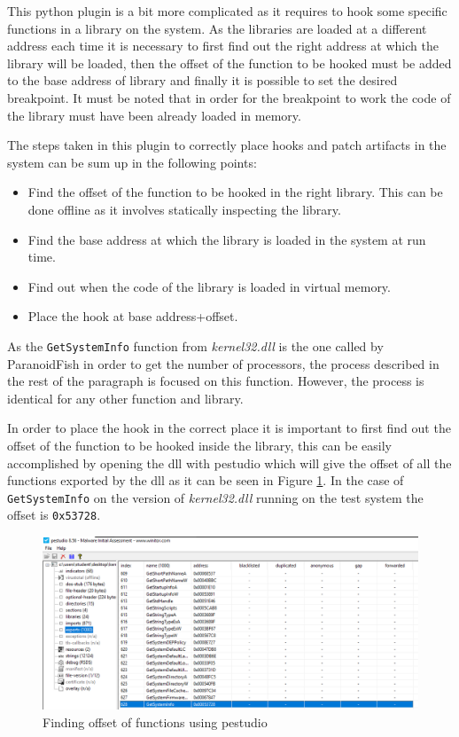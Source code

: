 This python plugin is a bit more complicated as it requires to hook some specific functions in a library on the system. As the libraries are loaded at a different address each time it is necessary to first find out the right address at which the library will be loaded, then the offset of the function to be hooked must be added to the base address of library and finally it is possible to set the desired breakpoint. It must be noted that in order for the breakpoint to work the code of the library must have been already loaded in memory. 

The steps taken in this plugin to correctly place hooks and patch artifacts in the system can be sum up in the following points:

\begin{itemize}
    \item Find the offset of the function to be hooked in the right library. This can be done offline as it involves statically inspecting the library.
    \item Find the base address at which the library is loaded in the system at run time.
    \item Find out when the code of the library is loaded in virtual memory.
    \item Place the hook at base address+offset.
\end{itemize}

As the \lstinline{GetSystemInfo} function from \textit{kernel32.dll} is the one called by ParanoidFish in order to get the number of processors, the process described in the rest of the paragraph is focused on this function. However, the process is identical for any other function and library.

In order to place the hook in the correct place it is important to first find out the offset of the function to be hooked inside the library, this can be easily accomplished by opening the dll with pestudio which will give the offset of all the functions exported by the dll as it can be seen in Figure \ref{fig:pestudio}. In the case of \lstinline{GetSystemInfo} on the version of \textit{kernel32.dll} running on the test system the offset is \lstinline{0x53728}.

\noindent
\begin{figure}[htp]
\centering
\includegraphics[width=\linewidth]{images/pestudio.png}
\caption{Finding offset of functions using pestudio}
\label{fig:pestudio}
\end{figure}


